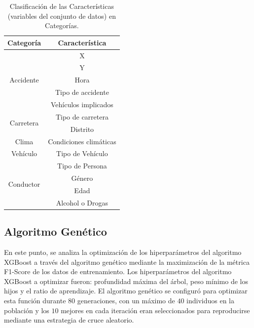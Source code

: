 \documentclass{uathesis-es}
\begin{document}
{\begin{table}[H]
		\begin{tabular}{ |c|c| }
			\hline
			\textbf{Categoría} & \textbf{Característica} \\
			\hline
			\hline
			\multirow{5}{*}{Accidente} & X \\
									   & Y \\
									   & Hora \\
									   & Tipo de accidente \\
									   & Vehículos implicados \\
			\hline
			\hline
			\multirow{2}{*}{Carretera} & Tipo de carretera \\
									   & Distrito \\
			\hline
			\hline
			Clima & Condiciones climáticas \\
			\hline
			\hline
			Vehículo & Tipo de Vehículo \\
			\hline
			\hline
			\multirow{4}{*}{Conductor}  & Tipo de Persona \\
									    & Género \\
									      & Edad \\
									    & Alcohol o Drogas \\
			\hline
			\hline
		\end{tabular}

	\caption{Clasificación de las Características (variables del conjunto de datos) en Categorías.}
	\label{JC}
\end{table}



\subsection*{Algoritmo Genético}



En este punto, se analiza la optimización de los hiperparámetros del algoritmo XGBoost a través del algoritmo genético mediante la maximización de la métrica F1-Score de los datos de entrenamiento. Los hiperparámetros del algoritmo XGBoost a optimizar fueron: profundidad máxima del árbol, peso mínimo de los hijos y el ratio de aprendizaje. El algoritmo genético se configuró para optimizar esta función durante $80$ generaciones, con un máximo de $40$ individuos en la población y los $10$ mejores en cada iteración eran seleccionados para reproducirse mediante una estrategia de cruce aleatorio.

}
\end{document}
